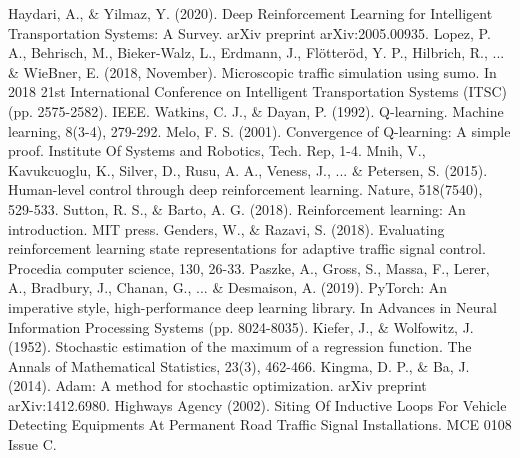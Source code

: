 \documentclass[conference]{IEEEtran}
\begin{document}
%
%
%
\begin{thebibliography}{1}
 Haydari, A., \& Yilmaz, Y. (2020). Deep Reinforcement Learning for Intelligent Transportation Systems: A Survey. arXiv preprint arXiv:2005.00935.
 Lopez, P. A., Behrisch, M., Bieker-Walz, L., Erdmann, J., Flötteröd, Y. P., Hilbrich, R., ... \& WieBner, E. (2018, November). Microscopic traffic simulation using sumo. In 2018 21st International Conference on Intelligent Transportation Systems (ITSC) (pp. 2575-2582). IEEE.
 Watkins, C. J., \& Dayan, P. (1992). Q-learning. Machine learning, 8(3-4), 279-292.
 Melo, F. S. (2001). Convergence of Q-learning: A simple proof. Institute Of Systems and Robotics, Tech. Rep, 1-4.
 Mnih, V., Kavukcuoglu, K., Silver, D., Rusu, A. A., Veness, J.,  ... \& Petersen, S. (2015). Human-level control through deep reinforcement learning. Nature, 518(7540), 529-533.
 Sutton, R. S., \& Barto, A. G. (2018). Reinforcement learning: An introduction. MIT press.
 Genders, W., \& Razavi, S. (2018). Evaluating reinforcement learning state representations for adaptive traffic signal control. Procedia computer science, 130, 26-33.
 Paszke, A., Gross, S., Massa, F., Lerer, A., Bradbury, J., Chanan, G., ... \& Desmaison, A. (2019). PyTorch: An imperative style, high-performance deep learning library. In Advances in Neural Information Processing Systems (pp. 8024-8035).
 Kiefer, J., \& Wolfowitz, J. (1952). Stochastic estimation of the maximum of a regression function. The Annals of Mathematical Statistics, 23(3), 462-466.
 Kingma, D. P., \& Ba, J. (2014). Adam: A method for stochastic optimization. arXiv preprint arXiv:1412.6980.
 Highways Agency (2002). Siting Of Inductive Loops For Vehicle Detecting Equipments At Permanent Road Traffic Signal Installations. MCE 0108 Issue C.
\end{thebibliography}


\end{document}
